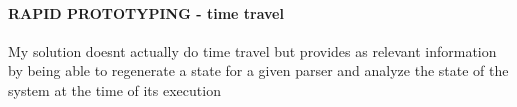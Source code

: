
	\paragraph{RAPID PROTOTYPING - time travel}

	
	My solution doesnt actually do time travel but provides as relevant information by being able to regenerate a state for a given parser and analyze the state of the system at the time of its execution





